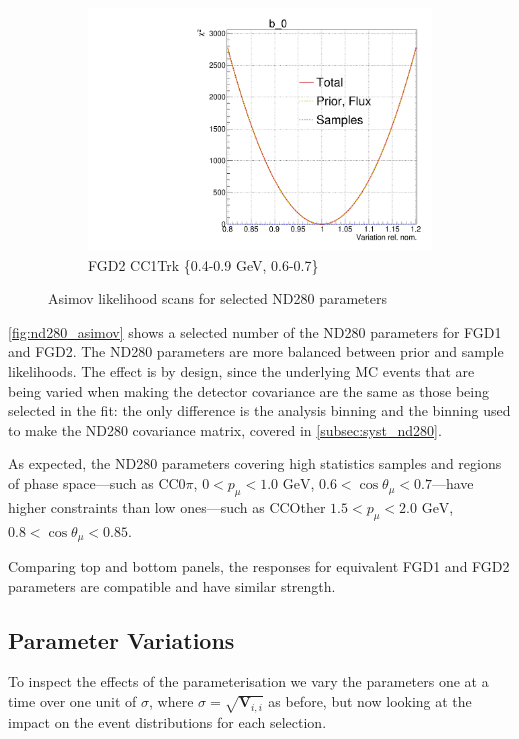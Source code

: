 \begin{figure}[!h]
\begin{subfigure}[t]{0.32\textwidth}
	\includegraphics[width=\textwidth, trim={0mm 0mm 0mm 11mm}, clip,page=542]{figures/mach3/Asimov/Full_LLHscan_18July_BeRPA_U_ND280logL_scan}
	\caption{FGD2 \numubar CC1Trk \{0.4-0.9 GeV, 0.6-0.7\}}
\end{subfigure}
\caption{Asimov likelihood scans for selected ND280 parameters}
\label{fig:nd280_asimov}
\end{figure}

\autoref{fig:nd280_asimov} shows a selected number of the ND280 parameters for FGD1 and FGD2. The ND280 parameters are more balanced between prior and sample likelihoods. The effect is by design, since the underlying MC events that are being varied when making the detector covariance are the same as those being selected in the fit: the only difference is the analysis binning and the binning used to make the ND280 covariance matrix, covered in \autoref{subsec:syst_nd280}.

As expected, the ND280 parameters covering high statistics samples and regions of phase space---such as CC0$\pi$, $0<p_\mu<1.0\text{ GeV}$, $0.6 < \cos\theta_\mu < 0.7$---have higher constraints than low ones---such as CCOther $1.5 < p_\mu < 2.0\text{ GeV}$, $0.8 < \cos\theta_\mu < 0.85$.

Comparing top and bottom panels, the responses for equivalent FGD1 and FGD2 parameters are compatible and have similar strength.

\subsection{Parameter Variations}
\label{sec:sigmavar}
To inspect the effects of the parameterisation we vary the parameters one at a time over one unit of $\sigma$, where $\sigma = \sqrt{\mathbf{V}_{i,i}}$ as before, but now looking at the impact on the event distributions for each selection.

